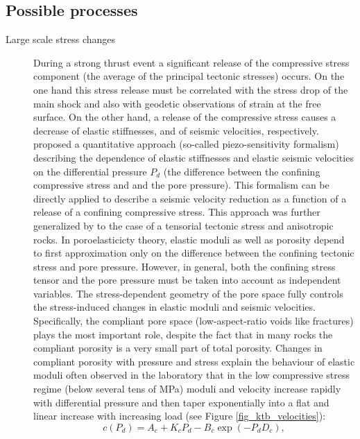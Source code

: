 \documentclass[11pt]{article}
\begin{document}
\subsection*{Possible processes}

\begin{description}
 \item[Large scale stress changes]
\label{sec:stress}
During a strong thrust event a significant release of the 
compressive stress component (the average of the principal tectonic 
stresses) occurs. On the one hand this stress release must be correlated 
with the stress drop of the main shock and also with geodetic observations of strain at the free surface. 
On the other hand, a release of the compressive stress causes a 
decrease of elastic stiffnesses, and of seismic velocities, 
respectively. 
\cite{shapiro:2003a} proposed a quantitative approach (so-called 
piezo-sensitivity formalism)  describing the dependence of elastic 
stiffnesses and
elastic seismic velocities on the differential pressure $P_d$ (the 
difference between the confining compressive stress and 
and the pore pressure). This formalism can be 
directly applied to describe a seismic velocity reduction as a function 
of  a release of a confining compressive stress.
This approach was further generalized by \cite{shapiroKaselow2005} to 
the case of a tensorial tectonic stress and anisotropic rocks.
In poroelasticicty theory,  elastic moduli
as well as porosity depend to first approximation only on
the difference between the confining tectonic stress and
pore pressure. However, in general, both the confining
stress tensor and the pore pressure must be taken into
account as independent variables. The stress-dependent
geometry of the pore space fully controls the stress-induced
changes in elastic moduli and seismic velocities.
Specifically, the compliant pore space (low-aspect-ratio voids like 
fractures) plays the most
important role, despite the fact that in many rocks the
compliant porosity is a very small part of total porosity.
Changes in compliant porosity with pressure and stress
explain the behaviour of elastic moduli often observed in the laboratory that
in the low compressive stress regime (below several tens of MPa)
moduli and velocity increase rapidly with differential pressure and then taper exponentially
into a flat and linear increase with increasing load (see Figure 
\ref{fig_ktb_velocities}):
\begin{equation}
c(P_d)= A_c + K_c P_d - B_c\exp{(-P_d D_c)},

\end{equation}
\end{description}
\end{document}
